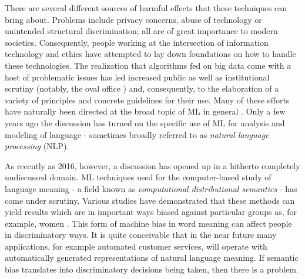 \documentclass{article}
\begin{document}
There are several different sources of harmful effects that these techniques can bring about. %
Problems include privacy concerns, abuse of technology or unintended structural discrimination; all are of great importance to modern societies. Consequently, people working at the intersection of information technology and ethics have attempted to lay down foundations on how to handle these technologies. The realization that algorithms fed on big data come with a host of problematic issues has led increased public as well as institutional scrutiny (notably, the oval office \cite{united2014big}) and, consequently, to the elaboration of a variety of principles and concrete guidelines for their use. Many of these efforts have naturally been directed at the broad topic of ML in general \cite{leidner2017ethical}. Only a few years ago the discussion has turned on the specific use of ML for analysis and modeling of language - sometimes broadly referred to as \emph{natural language processing} (NLP).

As recently as 2016, however, a discussion has opened up in a hitherto completely undiscussed domain. ML techniques used for the computer-based study of language meaning - a field known as \emph{computational distributional semantics} - has come under scrutiny.
Various studies have demonstrated that these methods can  yield results which are in important ways biased against particular groups as, for example, women \cite{bolukbasi2016man}\cite{wagner2015s}.
This form of machine bias in word meaning can affect people in discriminatory ways. It is quite conceivable that in the near future many applications, for example automated customer services, will operate with automatically generated representations of natural language meaning. If semantic bias translates into discriminatory decisions being taken, then there is a problem.
\end{document}
